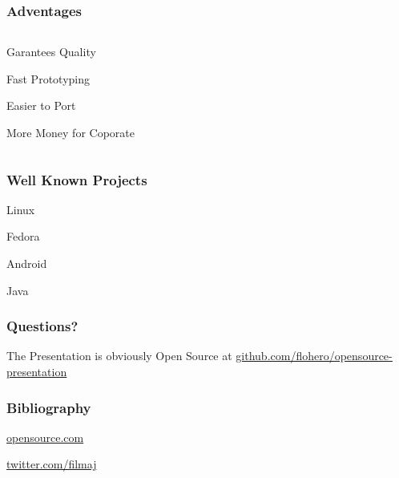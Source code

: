 \documentclass{beamer}
\begin{document}
\begin{frame}
  \frametitle{Adventages}
  \begin{columns}
    \begin{column}{0.5\textwidth}
      Garantees Quality

      Fast Prototyping

      Easier to Port

      More Money for Coporate
    \end{column}
  \end{columns}
\end{frame}

\begin{frame}
  \frametitle{Well Known Projects}
  Linux

  Fedora

  Android

  Java
\end{frame}


\begin{frame}
  \frametitle{Questions?}
  \begin{center}
    The Presentation is obviously Open Source at
    \underline{\href{https://github.com/flohero/opensource-presentation}{github.com/flohero/opensource-presentation}}
    \end{center}
\end{frame}

\begin{frame}
  \frametitle{Bibliography}
  \begin{center}
    \Large
    \href{https://opensource.com/open-source-way}{opensource.com}
    
    \href{https://twitter.com/filmaj}{twitter.com/filmaj}
    
  \end{center}
\end{frame}
\end{document}

